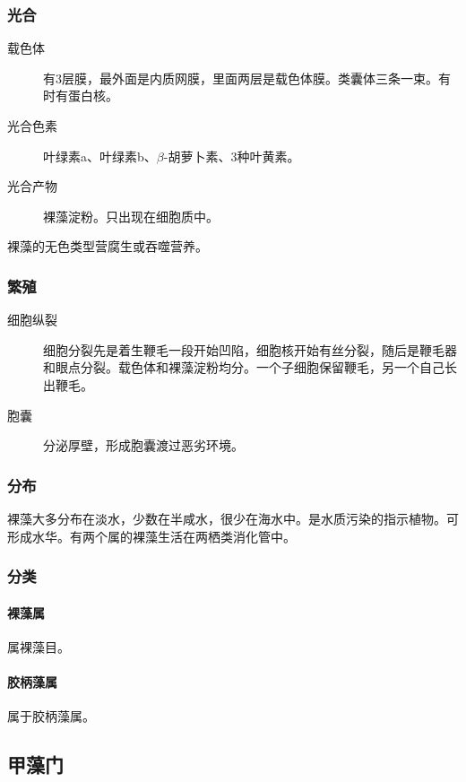 \subsubsection{光合}

\begin{description}
	\item[载色体] 有3层膜，最外面是内质网膜，里面两层是载色体膜。类囊体三条一束。有时有蛋白核。
	\item[光合色素] 叶绿素a、叶绿素b、$\beta$-胡萝卜素、3种叶黄素。
	\item[光合产物] 裸藻淀粉。只出现在细胞质中。
\end{description}

裸藻的无色类型营腐生或吞噬营养。

\subsubsection{繁殖}

\begin{description}
	\item[细胞纵裂] 细胞分裂先是着生鞭毛一段开始凹陷，细胞核开始有丝分裂，随后是鞭毛器和眼点分裂。载色体和裸藻淀粉均分。一个子细胞保留鞭毛，另一个自己长出鞭毛。
	\item[胞囊] 分泌厚壁，形成胞囊渡过恶劣环境。
\end{description}

\subsubsection{分布}

裸藻大多分布在淡水，少数在半咸水，很少在海水中。是水质污染的指示植物。可形成水华。有两个属的裸藻生活在两栖类消化管中。

\subsubsection{分类}

\paragraph{裸藻属}

属裸藻目。

\paragraph{胶柄藻属}

属于胶柄藻属。

\subsection{甲藻门}

